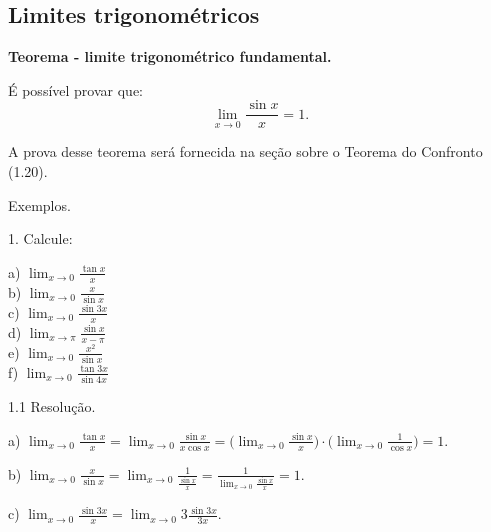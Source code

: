 \documentclass{article}
\begin{document}
{\begin{newpage}
\subsection{Limites trigonométricos}
\par
\begin{flushleft}
\textbf{Teorema - limite trigonométrico fundamental.}
\end{flushleft}
\par É possível provar que:
$$\displaystyle{\lim_{x\to 0}} \frac{\sin{x} }{x} = 1.$$
\par A prova desse teorema será fornecida na seção sobre o Teorema do Confronto (1.20).
\par
\vspace{0.3cm}
Exemplos.
\begin{flushleft}
1. Calcule:
\end{flushleft}
\par
\vspace{0.3cm}
\begin{multicols}{6}
\hspace{-15pt}a) $\displaystyle{\lim_{x\to 0}} \frac{\tan{x}}{x}$\\
b) $\displaystyle{\lim_{x\to 0}} \frac{x}{\sin{x}}$\\
c) $\displaystyle{\lim_{x\to 0}} \frac{\sin{3x}}{x}$\\
d) $\displaystyle{\lim_{x\to \pi }} \frac{\sin{x}}{x-\pi }$\\
e) $\displaystyle{\lim_{x\to 0}} \frac{x^2}{\sin{x}}$\\
f) $\displaystyle{\lim_{x\to 0}} \frac{\tan{3x}}{\sin{4x}}$
\end{multicols}
\par
\vspace{0.3cm}
\begin{flushleft}
1.1 Resolução.
\end{flushleft}
\par
a) $\displaystyle{\lim_{x\to 0} \frac{\tan{x}}{x} = \lim_{x\to 0} \frac{\sin{x}}{x\cos{x}} = \Big(\lim_{x\to 0} \frac{\sin{x}}{x}\Big)\cdot\Big(\lim_{x\to 0} \frac{1}{\cos{x}}\Big) = 1}$.
\par
\vspace{0.3cm}
b) $\displaystyle{\lim_{x\to 0} \frac{x}{\sin{x}} = \lim_{x\to 0} \frac{1}{\frac{\sin{x}}{x}} = \frac{1}{\lim_{x\to 0} \frac{\sin{x}}{x}} = 1}$.
\par
\vspace{0.3cm}
c) $\displaystyle{\lim_{x\to 0} \frac{\sin{3x}}{x} = \lim_{x\to 0} 3\frac{\sin{3x}}{3x}}$.

\end{newpage}}
\end{document}
